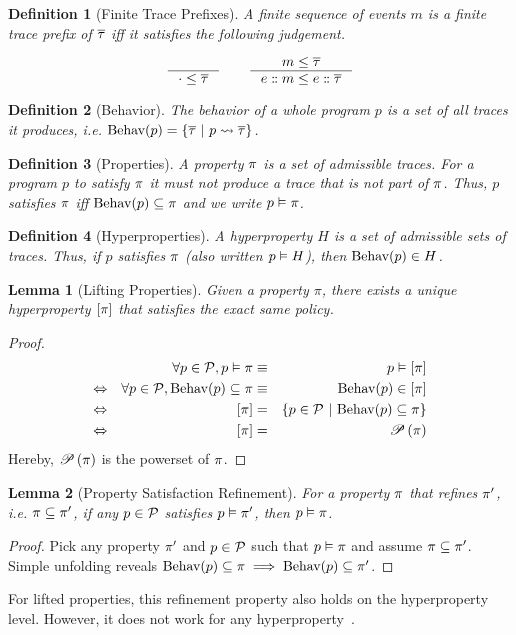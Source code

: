 \documentclass[a4paper,names,dvipsnames]{article}
\newtheorem{definition}{Definition}
\newtheorem{lemma}{Lemma}
\begin{document}
\begin{definition}[Finite Trace Prefixes]
  A finite sequence of events $m$ is a finite trace prefix of $\overline{\tau}$ iff it satisfies the following judgement.

  $$
    \inference{}{\cdot\le\trace}\hspace{2em}\inference{m\le\trace}{\seqcons{e}{m}\le \seqcons{e}{\trace}}
  $$
\end{definition}

\begin{definition}[Behavior]
  The behavior of a whole program $p$ is a set of all traces it produces, i.e. $\behav{p}=\{\trace\ |\ \mktrace{p}{\trace}\}$.
\end{definition}

\begin{definition}[Properties]
  A property $\pi$ is a set of admissible traces. For a program $p$ to satisfy $\pi$ it must not produce a trace that is not part of $\pi$. Thus, $p$ satisfies $\pi$ iff $\text{Behav}({p})\subseteq\pi$ and we write ${p}\vDash{\pi}$.
\end{definition}

\begin{definition}[Hyperproperties]
  A hyperproperty $H$ is a set of admissible sets of traces. Thus, if $p$ satisfies $\pi$ (also written ${p}\vDash{H}$), then $\text{Behav}({p})\in H$.
\end{definition}

\begin{lemma}[Lifting Properties]
  Given a property $\pi$, there exists a unique hyperproperty $\left[{\pi}\right]$ that satisfies the exact same policy.
\end{lemma}
\begin{proof}
  \begin{align*}
                    && \forall p\in\partials,\sat{p}{\prop}&\equiv&\sat{p}{\lift{\prop}} \\
    \Leftrightarrow && \forall p\in\partials,\behav{p}\subseteq{\prop}&\equiv&\behav{p}\in\lift{\prop} \\
    \Leftrightarrow && \lift{\prop}&=&\left\{p\in\partials\ |\ \behav{p}\subseteq\prop\right\} \\
    \Leftrightarrow && \lift{\prop}&=&\powerset{\prop}
  \end{align*}
  Hereby, $\mathscr{P}\left({\pi}\right)$ is the powerset of $\pi$.
\end{proof}

\begin{lemma}[Property Satisfaction Refinement]
  For a property $\pi$ that refines $\pi'$, i.e. $\pi\subseteq\pi'$, if any $p\in\mathcal{P}$ satisfies ${p}\vDash{\pi'}$, then ${p}\vDash{\pi}$.
\end{lemma}
\begin{proof}
  Pick any property $\pi'$ and $p\in\mathcal{P}$ such that ${p}\vDash{\pi}$ and assume $\pi\subseteq\pi'$.
  Simple unfolding reveals $\text{Behav}({p})\subseteq\pi\implies\text{Behav}({p})\subseteq\pi'$.
\end{proof}
\noindent
For lifted properties, this refinement property also holds on the hyperproperty level.
However, it does not work for any hyperproperty~\cite{clarkson08}.
\end{document}
